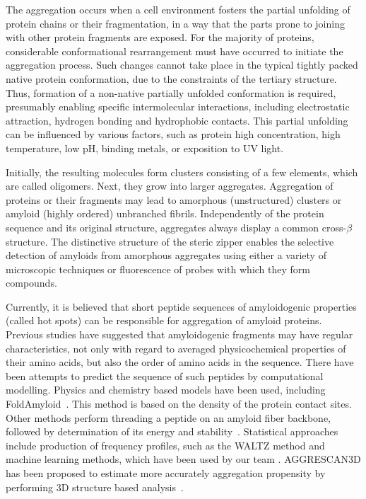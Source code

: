 \documentclass{bioinfo}
\begin{document}
  The aggregation occurs when a cell environment fosters the partial unfolding 
of protein chains or their fragmentation, in a way that the parts prone to 
joining with other protein fragments are exposed. For the majority of proteins, 
considerable conformational rearrangement must have occurred to initiate the 
aggregation process. Such changes cannot take place in the typical tightly 
packed native protein conformation, due to the constraints of the tertiary 
structure. Thus, formation of a non-native partially unfolded conformation is 
required, presumably enabling specific intermolecular interactions, including 
electrostatic attraction, hydrogen bonding and hydrophobic contacts. This 
partial unfolding can be influenced by various factors, such as protein high 
concentration, high temperature, low pH, binding metals, or exposition to UV 
light.

  Initially, the resulting molecules form clusters consisting of a few 
elements, which are called oligomers. Next, they grow into larger aggregates. 
Aggregation of proteins or their fragments may lead to amorphous (unstructured) 
clusters or amyloid (highly ordered) unbranched fibrils. Independently of the 
protein sequence and its original structure, aggregates always display a common 
cross-$\beta$ structure. The distinctive structure of the steric zipper enables 
the selective detection of amyloids from amorphous aggregates using either a 
variety of microscopic techniques or fluorescence of probes with which they form 
compounds.

  Currently, it is believed that short peptide sequences of amyloidogenic 
properties (called hot spots) can be responsible for aggregation of amyloid 
proteins.  Previous studies have suggested that amyloidogenic fragments may have 
regular characteristics, not only with regard to averaged physicochemical 
properties of their amino acids, but also the order of amino acids in the 
sequence. There have been attempts to predict the sequence of such peptides by 
computational modelling. Physics and chemistry based models have been used, 
including FoldAmyloid~\citep{garbuzynskiy_foldamyloid:_2010}. This method is 
based on the density of the protein contact sites. Other methods perform 
threading a peptide on an amyloid fiber backbone, followed by determination of 
its energy and stability~\citep{goldschmidt_identifying_2010, 
bryan_stitcher:_2012, odonnell_method_2011}. Statistical approaches include 
production of frequency profiles, such as the WALTZ method 
\citep{beerten_waltz-db:_2015} and machine learning methods, which have been 
used by our team \citep{stanislawski_machine_2013, gasior_fish_2014}. AGGRESCAN3D has been proposed to estimate 
more accurately aggregation propensity by performing 3D structure based 
analysis~\citep{zambrano_aggrescan3d_2015}. 
\end{document}
